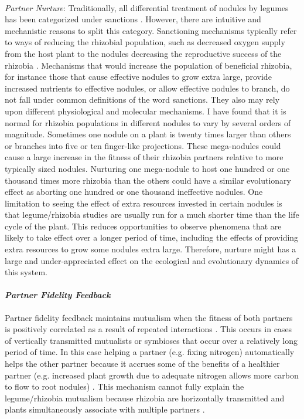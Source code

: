 \documentclass[12pt]{article}
\begin{document}
\begin{doublespace}
 \paragraph {}
 \textit{Partner Nurture}: 
 Traditionally, all differential treatment of nodules by legumes has been categorized under sanctions \cite{Kiers2003}. However, there are intuitive and mechanistic reasons to split this category. Sanctioning mechanisms typically refer to ways of reducing the rhizobial population, such as decreased oxygen supply from the host plant to the nodules decreasing the reproductive success of the rhizobia \cite{Kiers2003}.
 Mechanisms that would increase the population of beneficial rhizobia, for instance those that cause effective nodules to grow extra large, provide increased nutrients to effective nodules, or allow effective nodules to branch, do not fall under common definitions of the word sanctions. They also may rely upon different physiological and molecular mechanisms. I have found that it is normal for rhizobia populations in different nodules to vary by several orders of magnitude. Sometimes one nodule on a plant is twenty times larger than others or branches into five or ten finger-like projections. These mega-nodules could cause a large increase in the fitness of their rhizobia partners relative to more typically sized nodules.  Nurturing one mega-nodule to host one hundred or one thousand times more rhizobia than the others could have a similar evolutionary effect as aborting one hundred or one thousand ineffective nodules. One limitation to seeing the effect of extra resources invested in certain nodules is that legume/rhizobia studies are usually run for a much shorter time than the life cycle of the plant. This reduces opportunities to observe phenomena that are likely to take effect over a longer period of time, including the effects of providing extra resources to grow some nodules extra large. Therefore, nurture might has a large and under-appreciated effect on the ecological and evolutionary dynamics of this system.
 \paragraph{\textit{Partner Fidelity Feedback}} Partner fidelity feedback maintains mutualism when the fitness of both partners is positively correlated as a result of repeated interactions \cite{Sachs2004}. This occurs in cases of vertically transmitted mutualists or symbioses that occur over a relatively long period of time. In this case helping a partner (e.g. fixing nitrogen) automatically helps the other partner because it accrues some of the benefits of a healthier partner (e.g. increased plant growth due to adequate nitrogen allows more carbon to flow to root nodules) \cite{Sachs2004}. This mechanism cannot fully explain the legume/rhizobia mutualism because rhizobia are horizontally transmitted and plants simultaneously associate with multiple partners \cite{Kiers2011}. 

\end{doublespace}
\end{document}
